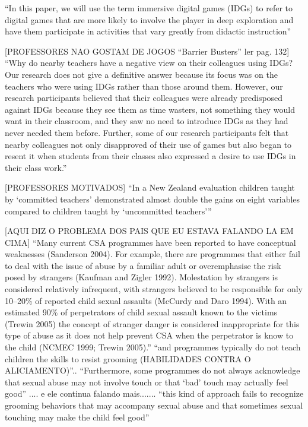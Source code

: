 ``In this paper, we will use the term immersive digital games (IDGs) to refer to digital games that are more likely to involve the player in deep exploration and have them participate in activities that vary greatly from didactic instruction'' \cite{dip2016advancing}

[PROFESSORES NAO GOSTAM DE JOGOS “Barrier Busters” ler pag. 132]
``Why do nearby teachers have a negative view on their colleagues using IDGs? Our research does not give a definitive answer because its focus was on the teachers who were using IDGs rather than those around them. However, our research participants believed that their colleagues were already predisposed against IDGs because they see them as time wasters, not something they would want in their classroom, and they saw no need to introduce IDGs as they had never needed them before. Further, some of our research participants felt that nearby colleagues not only disapproved of their use of games but also began to resent it when students from their classes also expressed a desire to use IDGs in their class work.''\cite{dip2016advancing}

[PROFESSORES MOTIVADOS]
``In a New Zealand evaluation children taught by ‘committed teachers’ demonstrated almost double the gains on eight variables compared to children taught by ‘uncommitted teachers’'' \cite{dip2016advancing}

[AQUI DIZ O PROBLEMA DOS PAIS QUE EU ESTAVA FALANDO LA EM CIMA]
``Many current CSA programmes have been reported to have conceptual weaknesses (Sanderson 2004). For example, there are programmes that either fail to deal with the issue of abuse by a familiar adult or overemphasise the risk posed by strangers (Kaufman and Zigler 1992). Molestation by strangers is considered relatively infrequent, with strangers believed to be responsible for only 10–20\% of reported child sexual assaults (McCurdy and Daro 1994). With an estimated 90\% of perpetrators of child sexual assault known to the victims (Trewin 2005) the concept of stranger danger is considered inappropriate for this type of abuse as it does not help prevent CSA when the perpetrator is know to the child (NCMEC 1999; Trewin 2005).''\cite{dip2016advancing} ``and programmes typically do not teach children the skills to resist grooming (HABILIDADES CONTRA O ALICIAMENTO)''.. ``Furthermore, some programmes do not always acknowledge that sexual abuse may not involve touch or that ‘bad’ touch may actually feel good'' .... e ele continua falando mais....... ``this kind of approach fails to recognize grooming behaviors that may accompany sexual abuse and that sometimes sexual touching may make the child feel good''



